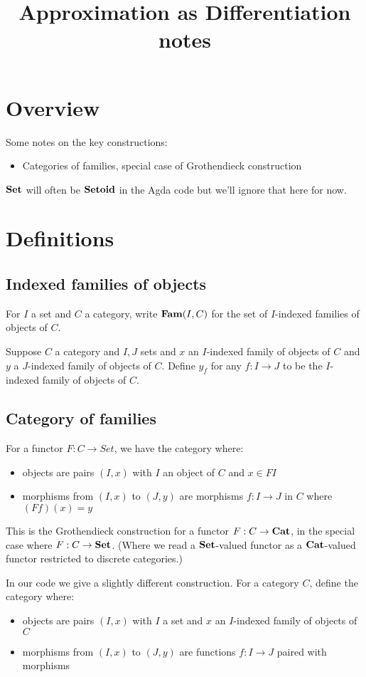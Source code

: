 \documentclass{acmart}
\begin{document}
\title{Approximation as Differentiation notes}
\maketitle

\section{Overview}

Some notes on the key constructions:
\begin{itemize}
\item Categories of families, special case of Grothendieck construction
\end{itemize}

$\mathbf{Set}$ will often be $\mathbf{Setoid}$ in the Agda code but we'll ignore that here for now.

\section{Definitions}

\subsection{Indexed families of objects}

For $I$ a set and $C$ a category, write $\mathbf{Fam}(I,C)$ for the set of $I$-indexed families of objects of $C$.

Suppose $C$ a category and $I, J$ sets and $x$ an $I$-indexed family of objects of $C$ and $y$ a $J$-indexed
family of objects of $C$. Define $y_f$ for any $f: I \to J$ to be the $I$-indexed family of objects of $C$.

\subsection{Category of families}

For a functor $F: C \to Set$, we have the category where:
\begin{itemize}
\item objects are pairs $(I, x)$ with $I$ an object of $C$ and $x \in FI$
\item morphisms from $(I, x)$ to $(J, y)$ are morphisms $f: I \to J$ in $C$ where $(Ff)(x) = y$
\end{itemize}

\noindent This is the Grothendieck construction for a functor $F: C \to \mathbf{Cat}$, in the special case where $F: C
\to \mathbf{Set}$. (Where we read a $\mathbf{Set}$-valued functor as a $\mathbf{Cat}$-valued functor restricted to discrete
categories.)

In our code we give a slightly different construction. For a category $C$, define the category where:
\begin{itemize}
\item objects are pairs $(I, x)$ with $I$ a set and $x$ an $I$-indexed family of objects of $C$
\item morphisms from $(I, x)$ to $(J, y)$ are functions $f: I \to J$ paired with morphisms
\end{itemize}
\end{document}
